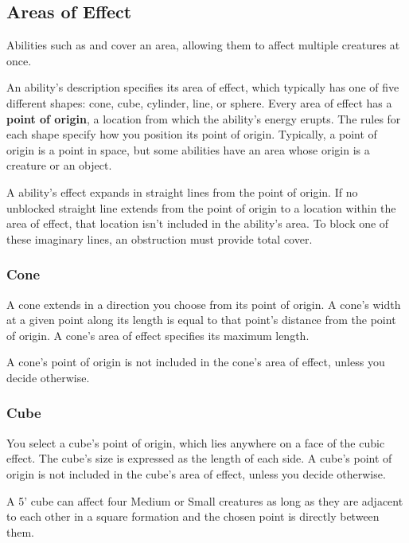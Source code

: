 \subsection{Areas of Effect}\label{subsec:areas-of-effect}

Abilities such as  and  cover an area, allowing them to affect multiple creatures at once.

An ability's description specifies its area of effect, which typically has one of five different shapes: cone, cube, cylinder, line, or sphere. Every area of effect has a \textbf{point of origin}, a location from which the ability's energy erupts. The rules for each shape specify how you position its point of origin. Typically, a point of origin is a point in space, but some abilities have an area whose origin is a creature or an object.

A ability's effect expands in straight lines from the point of origin. If no unblocked straight line extends from the point of origin to a location within the area of effect, that location isn't included in the ability's area. To block one of these imaginary lines, an obstruction must provide total cover.

\subsubsection{Cone}

A cone extends in a direction you choose from its point of origin. A cone's width at a given point along its length is equal to that point's distance from the point of origin. A cone's area of effect specifies its maximum length.

A cone's point of origin is not included in the cone's area of effect, unless you decide otherwise.

\subsubsection{Cube}

You select a cube's point of origin, which lies anywhere on a face of the cubic effect. The cube's size is expressed as the length of each side. A cube's point of origin is not included in the cube's area of effect, unless you decide otherwise.

A 5' cube can affect four Medium or Small creatures as long as they are adjacent to each other in a square formation and the chosen point is directly between them.

